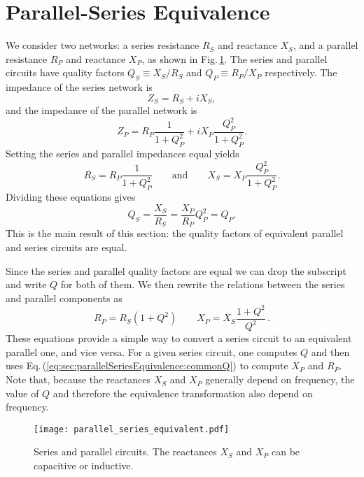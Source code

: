 \section{Parallel-Series Equivalence}

We consider two networks: a series resistance $R_{S}$ and reactance $X_{S}$, and a parallel resistance $R_P$ and reactance $X_P$, as shown in Fig.\,\ref{Fig:parallelSeriesEquivalent}.
The series and parallel circuits have quality factors $Q_S \equiv X_S / R_S$ and $Q_P \equiv R_P / X_P$ respectively.
The impedance of the series network is \begin{equation}
Z_{S}=R_{S}+iX_{S} , \end{equation}
and the impedance of the parallel network is \begin{equation}
Z_{P}=R_{P}\frac{1}{1+Q_{P}^{2}}+iX_{P}\frac{Q_{P}^{2}}{1+Q_{P}^{2}} . \end{equation}
Setting the series and parallel impedances equal yields \begin{equation}
R_{S}=R_{P}\frac{1}{1+Q_{P}^{2}} \qquad \text{and} \qquad X_{S}=X_{P}\frac{Q_{P}^{2}}{1+Q_{P}^{2}} . \end{equation}
Dividing these equations gives\begin{equation}
Q_S = \frac{X_{S}}{R_{S}}=\frac{X_{P}}{R_{P}}Q_{P}^{2}=Q_{P} . \end{equation}
This is the main result of this section: the quality factors of equivalent parallel and series circuits are equal.

Since the series and parallel quality factors are equal we can drop the subscript and write $Q$ for both of them.
We then rewrite the relations between the series and parallel components as \begin{equation}
R_{P}=R_{S}(1 + Q^2) \qquad X_{P} = X_{S}\frac{1 + Q^{2}}{Q^{2}} \, . \label{eq:sec:parallelSeriesEquivalence:commonQ} \end{equation}
These equations provide a simple way to convert a series circuit to an equivalent parallel one, and vice versa.
For a given series circuit, one computes $Q$ and then uses Eq.\,(\ref{eq:sec:parallelSeriesEquivalence:commonQ}) to compute $X_P$ and $R_P$.
Note that, because the reactances $X_S$ and $X_P$ generally depend on frequency, the value of $Q$ and therefore the equivalence transformation also depend on frequency.


\begin{figure}
\begin{centering}
\texttt{[image: parallel\_series\_equivalent.pdf]}
\par\end{centering}
\caption{Series and parallel circuits. The reactances $X_S$ and $X_P$ can be capacitive or inductive.}
\label{Fig:parallelSeriesEquivalent}
\end{figure}


